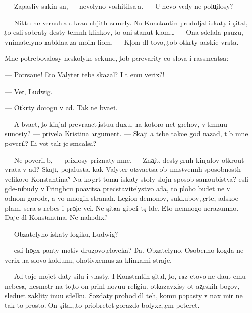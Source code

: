 \documentclass[10pt]{book}
\begin{document}
— Zapasliv{\yi}{\y} sukin s{\yi}n, — nevolyno voshitilsa {\y}a. — U nevo vedy ne polu{\c}ilosy?

— Nikto ne vernulsa s kra{\y}a objit{\yi}h zemely. No Konstantin prodoljal iskaty i s{\c}ital, {\c}to {\y}esli sobraty des{\ia}ty temn{\yi}h klinkov, to oni stanut kl{\iu}{\c}om… — Ona sdelala pauzu, vnimatelyno nabl{\iu}da{\y}a za mo{\y}im li{\q}om. — Kl{\iu}{\c}om dl{\ia} tovo, {\c}tob{\yi} otkr{\yi}ty adski{\y}e vrata.

Mne potrebovalosy neskolyko sekund, {\c}tob{\yi} perevarity {\y}e{\y}o slova i rassme{\y}atsa:

— Potr{\ia}sa{\y}u{\x}e! Eto Valyter tebe skazal? I t{\yi} {\y}emu verix?!

— Ver{\iu}, Ludwig.

— Otkr{\yi}ty dorogu v ad. Tak ne b{\yi}va{\y}et.

— A b{\yi}va{\y}et, {\c}to kinjal prevra{\x}a{\y}et {\c}istu{\y}u duxu, na kotoro{\y} net grehov, v t{\e}mnu{\y}u su{\x}nosty? — privela Kristina argument. — Skaji {\y}a tebe tako{\y}e god nazad, t{\yi} b{\yi} mne poveril? Ili vot tak je sme{\y}alsa?

— Ne poveril b{\yi}, — prixlosy priznaty mne. — Zna{\c}it, des{\ia}ty {\c}ern{\yi}h kinjalov otkro{\y}ut vrata v ad? Skaji, pojalu{\y}sta, kak Valyter otz{\yi}va{\y}etsa ob umstvenn{\yi}h sposobnost{\ia}h velikovo Konstantina? Na ko{\y} {\c}ert tomu iskaty stoly slojn{\yi}{\y} sposob samoubi{\y}stva? {\Y}esli gde-nibudy v Fringbou po{\y}avitsa predstavitelystvo ada, to ploho budet ne v odnom gorode, a vo mnogih stranah. Legion{\yi} demonov, sukkubov, {\c}erte{\y}, adsko{\y}e plam{\ia}, sera s nebes i pro{\c}i{\y}e ve{\x}i. Ne s{\c}ita{\y}a gibeli t{\yi}s{\ia}{\c} l{\iu}de{\y}. Eto nemnogo nerazumno. Daje dl{\ia} Konstantina. Ne nahodix?

— Ob{\ia}zatelyno iskaty logiku, Ludwig?

— {\Y}esli ho{\c}ex pon{\ia}ty motiv{\yi} drugovo {\c}eloveka? Da. Ob{\ia}zatelyno. Osobenno kogda ne verix na slovo koldunu, ohotivxemus{\ia} za klinkami straje{\y}.

— Ad toje mojet daty silu i vlasty. I Konstantin s{\c}ital, {\c}to, raz etovo ne da{\y}ut {\y}emu nebesa, nesmotr{\ia} na to {\c}to on prin{\ia}l novu{\y}u religi{\y}u, otkazavxisy ot {\y}az{\yi}{\c}eskih bogov, sledu{\y}et zakl{\iu}{\c}ity inu{\y}u sdelku. Sozdaty prohod dl{\ia} teh, komu popasty v nax mir ne tak-to prosto. On s{\c}ital, {\c}to priobretet gorazdo bolyxe, {\c}em poter{\ia}{\y}et.
\end{document}
